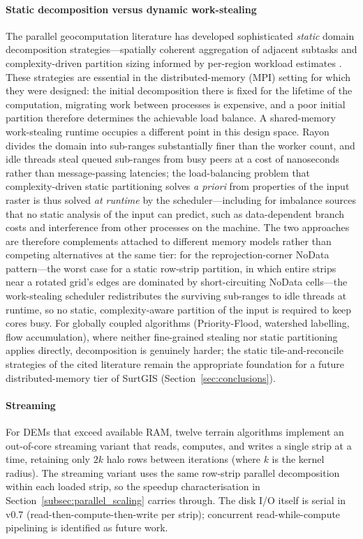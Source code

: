 \documentclass[preprint,review,12pt,authoryear]{elsarticle}
\newif\ifmarkedrev
\newcommand{\revtext}[1]{\ifmarkedrev\textcolor{blue}{#1}\else#1\fi}
\begin{document}
\paragraph{\revtext{Static decomposition versus dynamic work-stealing}} \revtext{The parallel geocomputation literature has developed sophisticated \emph{static} domain decomposition strategies---spatially coherent aggregation of adjacent subtasks and complexity-driven partition sizing informed by per-region workload estimates \citep{qin2014strategy, wang2021loadbalancing}. These strategies are essential in the distributed-memory (MPI) setting for which they were designed: the initial decomposition there is fixed for the lifetime of the computation, migrating work between processes is expensive, and a poor initial partition therefore determines the achievable load balance. A shared-memory work-stealing runtime occupies a different point in this design space. Rayon divides the domain into sub-ranges substantially finer than the worker count, and idle threads steal queued sub-ranges from busy peers at a cost of nanoseconds rather than message-passing latencies; the load-balancing problem that complexity-driven static partitioning solves \emph{a priori} from properties of the input raster is thus solved \emph{at runtime} by the scheduler---including for imbalance sources that no static analysis of the input can predict, such as data-dependent branch costs and interference from other processes on the machine. The two approaches are therefore complements attached to different memory models rather than competing alternatives at the same tier: for the reprojection-corner NoData pattern---the worst case for a static row-strip partition, in which entire strips near a rotated grid's edges are dominated by short-circuiting NoData cells---the work-stealing scheduler redistributes the surviving sub-ranges to idle threads at runtime, so no static, complexity-aware partition of the input is required to keep cores busy. For globally coupled algorithms (Priority-Flood, watershed labelling, flow accumulation), where neither fine-grained stealing nor static partitioning applies directly, decomposition is genuinely harder; the static tile-and-reconcile strategies of the cited literature remain the appropriate foundation for a future distributed-memory tier of SurtGIS (Section~\ref{sec:conclusions}).}

\paragraph{Streaming} For DEMs that exceed available RAM, twelve terrain algorithms implement an out-of-core streaming variant that reads, computes, and writes a single strip at a time, retaining only $2k$ halo rows between iterations (where $k$ is the kernel radius). The streaming variant uses the same row-strip parallel decomposition within each loaded strip, so the speedup characterisation in Section~\ref{subsec:parallel_scaling} carries through. The disk I/O itself is serial in v0.7 (read-then-compute-then-write per strip); concurrent read-while-compute pipelining is identified as future work.
\end{document}
